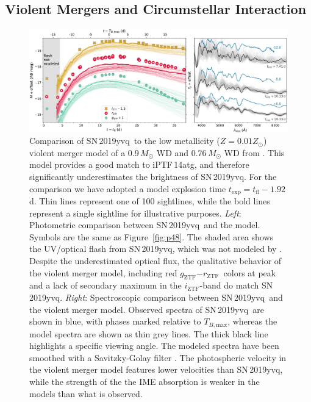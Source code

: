 \documentclass[twocolumn]{aastex63}
\newcommand{\rztf}{$r_\mathrm{ZTF}$}
\newcommand{\gztf}{$g_\mathrm{ZTF}$}
\newcommand{\iztf}{$i_\mathrm{ZTF}$}
\newcommand{\tbmax}{$T_{B,\mathrm{max}}$}
\newcommand{\sn}{SN\,2019yvq}
\begin{document}
\subsection{Violent Mergers and Circumstellar
Interaction}\label{sec:merger_csm}

\begin{figure}[ht]
    \centering
    \includegraphics[width=\textwidth]{./figures/violent_merger.pdf}
    \caption{Comparison of \sn\ to the low metallicity ($Z = 0.01 Z_\odot$)
    violent merger model of a 0.9\,$M_\odot$ WD and 0.76\,$M_\odot$ WD from
    \citet{Kromer16}. This model provides a good match to iPTF\,14atg, and
    therefore significantly underestimates the brightness of \sn. For the
    comparison we have adopted a model explosion time $t_\mathrm{exp} =
    t_\mathrm{fl} - 1.92$\,d. Thin lines represent one of 100 sightlines,
    while the bold lines represent a single sightline for illustrative
    purposes. \textit{Left}: Photometric comparison between \sn\ and the
    model. Symbols are the same as Figure~\ref{fig:p48}. The shaded area shows
    the UV/optical flash from \sn, which was not modeled by \citet{Kromer16}.
    Despite the underestimated optical flux, the qualitative behavior of the
    violent merger model, including red \gztf$ - $\rztf\ colors at peak and a
    lack of secondary maximum in the \iztf-band do match \sn. \textit{Right}:
    Spectroscopic comparison between \sn\ and the violent merger model.
    Observed spectra of \sn\ are shown in blue, with phases marked relative to
    \tbmax, whereas the model spectra are shown as thin grey lines. The thick
    black line highlights a specific viewing angle. The modeled spectra have
    been smoothed with a Savitzky-Golay filter \citep{Savitzky64}. The
    photospheric velocity in the violent merger model features lower
    velocities than \sn, while the strength of the the IME absorption is
    weaker in the models than what is observed.}
    \label{fig:violent_merger}
\end{figure}
\end{document}
